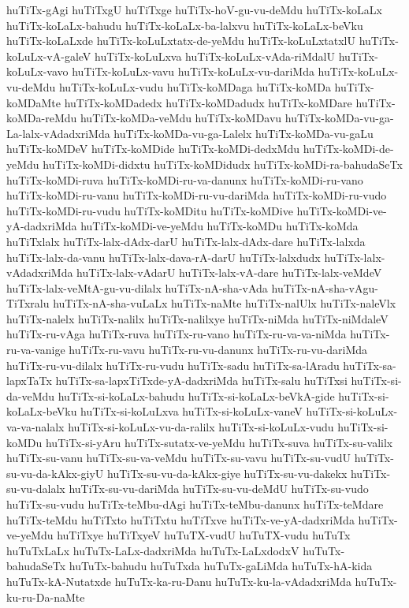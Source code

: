 {huTiTx-gAgi
huTiTxgU
huTiTxge
huTiTx-hoV-gu-vu-deMdu
huTiTx-koLaLx
huTiTx-koLaLx-bahudu
huTiTx-koLaLx-ba-lalxvu
huTiTx-koLaLx-beVku
huTiTx-koLaLxde
huTiTx-koLuLxtatx-de-yeMdu
huTiTx-koLuLxtatxlU
huTiTx-koLuLx-vA-galeV
huTiTx-koLuLxva
huTiTx-koLuLx-vAda-riMdalU
huTiTx-koLuLx-vavo
huTiTx-koLuLx-vavu
huTiTx-koLuLx-vu-dariMda
huTiTx-koLuLx-vu-deMdu
huTiTx-koLuLx-vudu
huTiTx-koMDaga
huTiTx-koMDa
huTiTx-koMDaMte
huTiTx-koMDadedx
huTiTx-koMDadudx
huTiTx-koMDare
huTiTx-koMDa-reMdu
huTiTx-koMDa-veMdu
huTiTx-koMDavu
huTiTx-koMDa-vu-ga-La-lalx-vAdadxriMda
huTiTx-koMDa-vu-ga-Lalelx
huTiTx-koMDa-vu-gaLu
huTiTx-koMDeV
huTiTx-koMDide
huTiTx-koMDi-dedxMdu
huTiTx-koMDi-de-yeMdu
huTiTx-koMDi-didxtu
huTiTx-koMDidudx
huTiTx-koMDi-ra-bahudaSeTx
huTiTx-koMDi-ruva
huTiTx-koMDi-ru-va-danunx
huTiTx-koMDi-ru-vano
huTiTx-koMDi-ru-vanu
huTiTx-koMDi-ru-vu-dariMda
huTiTx-koMDi-ru-vudo
huTiTx-koMDi-ru-vudu
huTiTx-koMDitu
huTiTx-koMDive
huTiTx-koMDi-ve-yA-dadxriMda
huTiTx-koMDi-ve-yeMdu
huTiTx-koMDu
huTiTx-koMda
huTiTxlalx
huTiTx-lalx-dAdx-darU
huTiTx-lalx-dAdx-dare
huTiTx-lalxda
huTiTx-lalx-da-vanu
huTiTx-lalx-dava-rA-darU
huTiTx-lalxdudx
huTiTx-lalx-vAdadxriMda
huTiTx-lalx-vAdarU
huTiTx-lalx-vA-dare
huTiTx-lalx-veMdeV
huTiTx-lalx-veMtA-gu-vu-dilalx
huTiTx-nA-sha-vAda
huTiTx-nA-sha-vAgu-TiTxralu
huTiTx-nA-sha-vuLaLx
huTiTx-naMte
huTiTx-nalUlx
huTiTx-naleVlx
huTiTx-nalelx
huTiTx-nalilx
huTiTx-nalilxye
huTiTx-niMda
huTiTx-niMdaleV
huTiTx-ru-vAga
huTiTx-ruva
huTiTx-ru-vano
huTiTx-ru-va-va-niMda
huTiTx-ru-va-vanige
huTiTx-ru-vavu
huTiTx-ru-vu-danunx
huTiTx-ru-vu-dariMda
huTiTx-ru-vu-dilalx
huTiTx-ru-vudu
huTiTx-sadu
huTiTx-sa-lAradu
huTiTx-sa-lapxTaTx
huTiTx-sa-lapxTiTxde-yA-dadxriMda
huTiTx-salu
huTiTxsi
huTiTx-si-da-veMdu
huTiTx-si-koLaLx-bahudu
huTiTx-si-koLaLx-beVkA-gide
huTiTx-si-koLaLx-beVku
huTiTx-si-koLuLxva
huTiTx-si-koLuLx-vaneV
huTiTx-si-koLuLx-va-va-nalalx
huTiTx-si-koLuLx-vu-da-ralilx
huTiTx-si-koLuLx-vudu
huTiTx-si-koMDu
huTiTx-si-yAru
huTiTx-sutatx-ve-yeMdu
huTiTx-suva
huTiTx-su-valilx
huTiTx-su-vanu
huTiTx-su-va-veMdu
huTiTx-su-vavu
huTiTx-su-vudU
huTiTx-su-vu-da-kAkx-giyU
huTiTx-su-vu-da-kAkx-giye
huTiTx-su-vu-dakekx
huTiTx-su-vu-dalalx
huTiTx-su-vu-dariMda
huTiTx-su-vu-deMdU
huTiTx-su-vudo
huTiTx-su-vudu
huTiTx-teMbu-dAgi
huTiTx-teMbu-danunx
huTiTx-teMdare
huTiTx-teMdu
huTiTxto
huTiTxtu
huTiTxve
huTiTx-ve-yA-dadxriMda
huTiTx-ve-yeMdu
huTiTxye
huTiTxyeV
huTuTX-vudU
huTuTX-vudu
huTuTx
huTuTxLaLx
huTuTx-LaLx-dadxriMda
huTuTx-LaLxdodxV
huTuTx-bahudaSeTx
huTuTx-bahudu
huTuTxda
huTuTx-gaLiMda
huTuTx-hA-kida
huTuTx-kA-Nutatxde
huTuTx-ka-ru-Danu
huTuTx-ku-la-vAdadxriMda
huTuTx-ku-ru-Da-naMte
}
